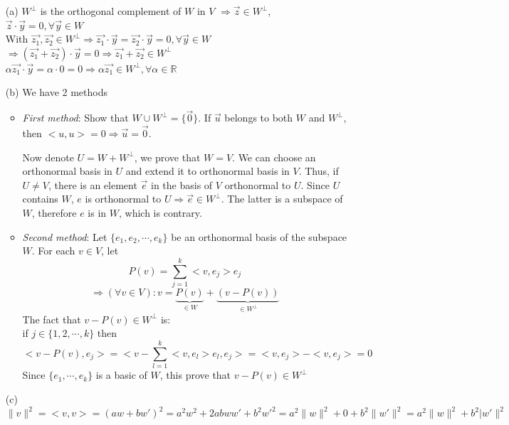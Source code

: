 \begin{exer}[7.46]
	\begin{enumerate}
		\item [(a)] $W^\perp$ is the orthogonal complement of $W$ in $V$ $\Rightarrow \vec{z} \in W^\perp$, $\vec{z}\cdot\vec{y} = 0, \forall \vec{y} \in W$ \\ With $\vec{z_1}, \vec{z_2} \in W^\perp \Rightarrow \vec{z_1}\cdot\vec{y} = \vec{z_2}\cdot\vec{y} = 0, \forall \vec{y} \in W$ \\ $\Rightarrow (\vec{z_1} + \vec{z_2})\cdot\vec{y} = 0 \Rightarrow \vec{z_1} + \vec{z_2} \in W^\perp$ \\ $\alpha\vec{z_1}\cdot\vec{y} = \alpha \cdot 0 = 0 \Rightarrow \alpha\vec{z_1} \in W^\perp, \forall \alpha \in \mathbb{R}$
		\item [(b)] We have 2 methods
		\begin{itemize}
			\item \textit{First method}: Show that $W \cup W^\perp = \{\vec{0}\}$. If $\vec{u}$ belongs to both $W$ and $W^\perp$, then $<u, u> = 0 \Rightarrow \vec{u} = \vec{0}$.
			
			Now denote $U = W + W^\perp$, we prove that $W = V$. We can choose an orthonormal basis in $U$ and extend it to orthonormal basis in $V$. Thus, if $U \neq V$, there is an element $\vec{e}$ in the basis of $V$ orthonormal to $U$. Since $U$ contains $W$, $e$ is orthonormal to $U \Rightarrow \vec{e} \in W^\perp$. The latter is a subspace of $W$, therefore $e$ is in $W$, which is contrary.
			\item \textit{Second method}: Let $\{e_1, e_2, \cdots, e_k\}$ be an orthonormal basis of the subspace $W$. For each $v \in V$, let $$P(v) = \sum_{j=1}^{k} <v, e_j> e_j$$ $$\Rightarrow (\forall v \in V): v = \underbrace{P(v)}_{\in W} + \underbrace{(v - P(v))}_{\in W^\perp}$$
			The fact that $v - P(v) \in W^\perp$ is: \\ if $j \in \{1, 2, \cdots, k\}$ then $$<v-P(v), e_j> = <v - \sum_{l=1}^{k}<v, e_l>e_l, e_j> = <v, e_j> - <v, e_j> = 0$$
			Since $\{e_1, \cdots, e_k\}$ is a basic of $W$, this prove that $v-P(v) \in W^\perp$
		\end{itemize}
		\item [(c)] $\lVert v \rVert^2 = <v, v> = (aw + bw')^2 = a^2w^2 + 2abww' + b^2w'^2 = a^2 \lVert w \rVert^2 + 0 + b^2 \lVert w' \rVert^2 = a^2 \lVert w \rVert^2 + b^2 \lvert w' \rVert^2$
	\end{enumerate}
\end{exer}